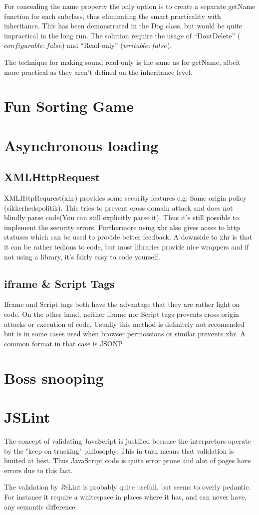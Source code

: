 \documentclass[a4paper,10pt]{article}
\begin{document}
For concealing the name property the only option is to create a
separate getName function for each subclass, thus eliminating the
smart practicality with inheritance.  This has been demonstrated in
the Dog class, but would be quite impractical in the long run.  The
solution require the usage of ``DontDelete'' ($configurable: false$)
and ``Read-only'' ($writable: false$).

The technique for making sound read-only is the same as for getName,
albeit more practical as they aren't defined on the inheritance level.

\section*{Fun Sorting Game}


\section*{Asynchronous loading}
\subsection*{XMLHttpRequest}
  XMLHttpRequrest(xhr) provides some security features e.g:
Same origin policy (sikkerhedspolitik). This tries to prevent cross domain attack and does not blindly parse code(You can still explicitly parse it). Thus it's still possible to implement the security errors.
Furthermore using xhr also gives acess to http statuses which can be used to provide better feedback.
A downside to xhr is that it can be rather tedious to code, but most libraries provide nice wrappers and if not using a library, it's fairly easy to code yourself.

\subsection*{iframe \& Script Tags}
Iframe and Script tags both have the advantage that they are rather light on code. On the other hand, neither iframe nor Script tags prevents cross origin attacks or execution of code. Usually this method is definitely not recomended but is in some cases used when browser permossions or similar prevents xhr. A common format in that case is JSONP.

\section*{Boss snooping}


\section*{JSLint}
The concept of validating JavaScript is justified because the interpretors operate by the "keep on trucking" philosophy. This in turn means that validation is limited at best. Thus JavaScript code is quite error prone and alot of pages have errors due to this fact.

The validation by JSLint is probably quite usefull, but seems to overly pedantic. For instance it require a whitespace in places where it has, and can never have, any semantic difference. 
\end{document}
